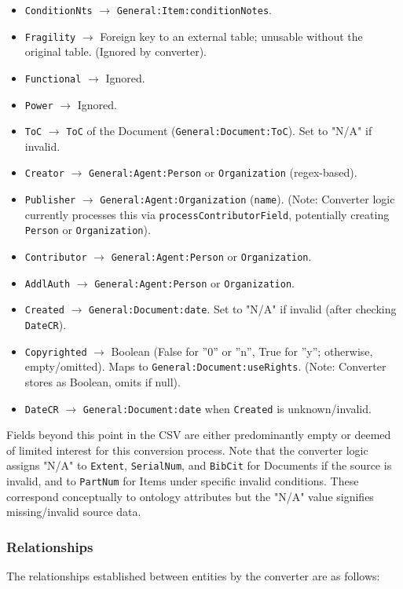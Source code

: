 \begin{itemize}
    \item \texttt{ConditionNts} $\rightarrow$ \texttt{General:Item:conditionNotes}.
    \item \texttt{Fragility} $\rightarrow$ Foreign key to an external table; unusable without the original table. (Ignored by converter).
    \item \texttt{Functional} $\rightarrow$ Ignored.
    \item \texttt{Power} $\rightarrow$ Ignored.
    \item \texttt{ToC} $\rightarrow$ \texttt{ToC} of the Document (\texttt{General:Document:ToC}). Set to "N/A" if invalid.
    \item \texttt{Creator} $\rightarrow$ \texttt{General:Agent:Person} or \texttt{Organization} (regex-based).
    \item \texttt{Publisher} $\rightarrow$ \texttt{General:Agent:Organization} (\texttt{name}). (Note: Converter logic currently processes this via \texttt{processContributorField}, potentially creating \texttt{Person} or \texttt{Organization}).
    \item \texttt{Contributor} $\rightarrow$ \texttt{General:Agent:Person} or \texttt{Organization}.
    \item \texttt{AddlAuth} $\rightarrow$ \texttt{General:Agent:Person} or \texttt{Organization}.
    \item \texttt{Created} $\rightarrow$ \texttt{General:Document:date}. Set to "N/A" if invalid (after checking \texttt{DateCR}).
    \item \texttt{Copyrighted} $\rightarrow$ Boolean (False for ”0” or ”n”, True for ”y”; otherwise, empty/omitted). Maps to \texttt{General:Document:useRights}. (Note: Converter stores as Boolean, omits if null).
    \item \texttt{DateCR} $\rightarrow$ \texttt{General:Document:date} when \texttt{Created} is unknown/invalid.
\end{itemize}
Fields beyond this point in the CSV are either predominantly empty or deemed of limited interest for this conversion process. Note that the converter logic assigns "N/A" to \texttt{Extent}, \texttt{SerialNum}, and \texttt{BibCit} for Documents if the source is invalid, and to \texttt{PartNum} for Items under specific invalid conditions. These correspond conceptually to ontology attributes but the "N/A" value signifies missing/invalid source data.

\subsubsection{Relationships}
The relationships established between entities by the converter are as follows:

